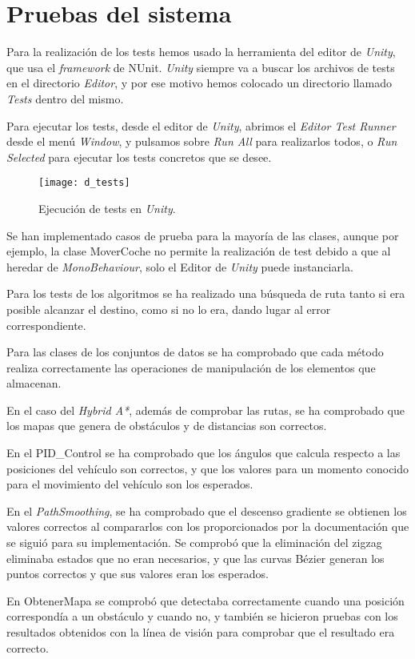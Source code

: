 \section{Pruebas del sistema}
Para la realización de los tests hemos usado la herramienta del editor de \textit{Unity}, que usa el \textit{framework} de NUnit. \textit{Unity} siempre va a buscar los archivos de tests en el directorio \textit{Editor}, y por ese motivo hemos colocado un directorio llamado \textit{Tests} dentro del mismo.

Para ejecutar los tests, desde el editor de \textit{Unity}, abrimos el \textit{Editor Test Runner} desde el menú \textit{Window}, y pulsamos sobre \textit{Run All} para realizarlos todos, o \textit{Run Selected} para ejecutar los tests concretos que se desee.

\begin{figure}[htpb]
    \centering
    \texttt{[image: d\_tests]}
    \caption[Ejecución de tests en \textit{Unity}]{Ejecución de tests en \textit{Unity}.}
    \label{fig:dejecutar}
\end{figure}

Se han implementado casos de prueba para la mayoría de las clases, aunque por ejemplo, la clase MoverCoche no permite la realización de test debido a que al heredar de \textit{MonoBehaviour}, solo el Editor de \textit{Unity} puede instanciarla.

Para los tests de los algoritmos se ha realizado una búsqueda de ruta tanto si era posible alcanzar el destino, como si no lo era, dando lugar al error correspondiente.

Para las clases de los conjuntos de datos se ha comprobado que cada método realiza correctamente las operaciones de manipulación de los elementos que almacenan.

En el caso del \textit{Hybrid A*}, además de comprobar las rutas, se ha comprobado que los mapas que genera de obstáculos y de distancias son correctos.

En el PID\_Control se ha comprobado que los ángulos que calcula respecto a las posiciones del vehículo son correctos, y que los valores para un momento conocido para el movimiento del vehículo son los esperados.

En el \textit{PathSmoothing}, se ha comprobado que el descenso gradiente se obtienen los valores correctos al compararlos con los proporcionados por la documentación que se siguió para su implementación. Se comprobó que la eliminación del zigzag eliminaba estados que no eran necesarios, y que las curvas Bézier generan los puntos correctos y que sus valores eran los esperados.

En ObtenerMapa se comprobó que detectaba correctamente cuando una posición correspondía a un obstáculo y cuando no, y también se hicieron pruebas con los resultados obtenidos con la línea de visión para comprobar que el resultado era correcto.
